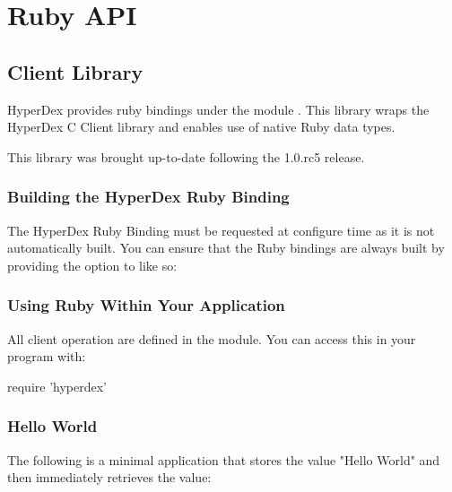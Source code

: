 \chapter{Ruby API}
\label{chap:api:ruby}

\section{Client Library}
\label{sec:api:ruby:client}

HyperDex provides ruby bindings under the module .  This
library wraps the HyperDex C Client library and enables use of native Ruby data
types.

This library was brought up-to-date following the 1.0.rc5 release.

\subsection{Building the HyperDex Ruby Binding}
\label{sec:api:ruby:building}

The HyperDex Ruby Binding must be requested at configure time as it is not
automatically built.  You can ensure that the Ruby bindings are always built by
providing the  option to  like
so:

\begin{consolecode}
\end{consolecode}

\subsection{Using Ruby Within Your Application}
\label{sec:api:ruby:using}

All client operation are defined in the  module.  You can
access this in your program with:

\begin{rubycode}
require 'hyperdex'
\end{rubycode}

\subsection{Hello World}
\label{sec:api:ruby:hello-world}

The following is a minimal application that stores the value "Hello World" and
then immediately retrieves the value:

